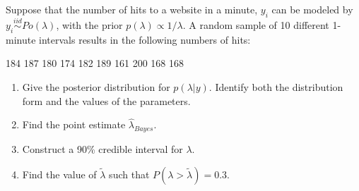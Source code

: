   \item 
    Suppose that the number of hits to a website in a minute, $y_i$ can be modeled by $y_i\stackrel{iid}{\sim}Po(\lambda)$, with the prior  $p(\lambda) \propto 1/ \lambda$. A random sample of 10 different 1-minute intervals results in the following numbers of hits: 
    
    184	187	180	174	182	189	161	200	168	168
    
    \begin{enumerate}
      \item Give the posterior distribution for $p( \lambda | y)$. Identify both the distribution form and the values of the parameters. 
      \item Find the point estimate $\hat{\lambda}_{Bayes}$. 
      \item Construct a 90\% credible interval for $\lambda$. 
      \item Find the value of $\tilde{\lambda}$ such that $P(\lambda>\tilde{\lambda})=0.3$.
\end{enumerate}

